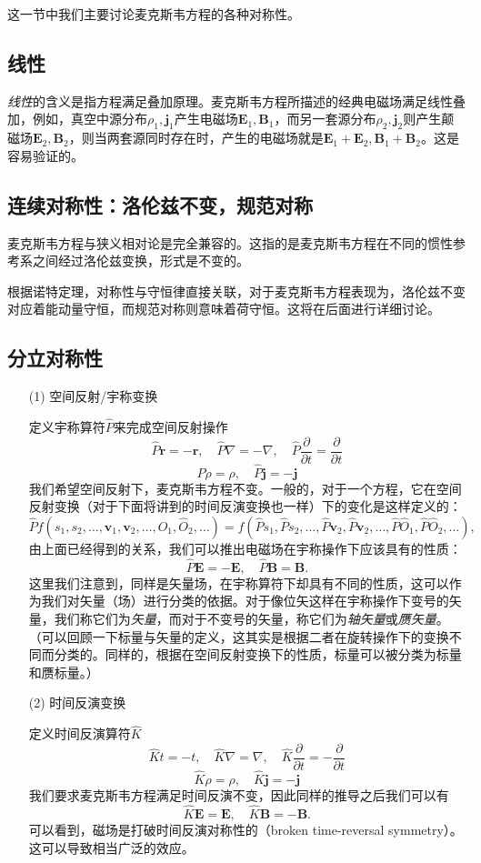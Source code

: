\documentclass[UTF8]{ctexbook}
\renewcommand{\b}{\boldsymbol}
\numberwithin{equation}{chapter}
\begin{document}
	这一节中我们主要讨论麦克斯韦方程的各种对称性。
	\subsection{线性}
	\emph{线性}的含义是指方程满足叠加原理。麦克斯韦方程所描述的经典电磁场满足线性叠加，例如，真空中源分布$\rho_1,\b{j}_1$产生电磁场$\b{E}_1,\b{B}_1$，而另一套源分布$\rho_2,\b{j}_2$则产生颠磁场$\b{E}_2,\b{B}_2$，则当两套源同时存在时，产生的电磁场就是$\b{E}_1+\b{E}_2,\b{B}_1+\b{B}_2$。这是容易验证的。
	
	\subsection{连续对称性：洛伦兹不变，规范对称}
	麦克斯韦方程与狭义相对论是完全兼容的。这指的是麦克斯韦方程在不同的惯性参考系之间经过洛伦兹变换，形式是不变的。
	
	根据诺特定理，对称性与守恒律直接关联，对于麦克斯韦方程表现为，洛伦兹不变对应着能动量守恒，而规范对称则意味着荷守恒。这将在后面进行详细讨论。
	
	\subsection{分立对称性}
	\begin{itemize}
		\item[(1)]空间反射/宇称变换
		
		定义宇称算符$\hat{P}$来完成空间反射操作
		\[\hat{P}\b{r}=-\b{r},\quad\hat{P}\nabla=-\nabla,\quad \hat{P}\frac{\partial}{\partial t}=\frac{\partial }{\partial t}\]
		\[\hat{P}\rho=\rho,\quad \hat{P}\b{j}=-\b{j}\]
		 我们希望空间反射下，麦克斯韦方程不变。一般的，对于一个方程，它在空间反射变换（对于下面将讲到的时间反演变换也一样）下的变化是这样定义的：
		 \[\hat{P}f(s_1,s_2,\dots,\b{v}_1,\b{v}_2,\dots,\hat{O}_1,\hat{O}_2,\dots)=f(\hat{P}s_1,\hat{P}s_2,\dots,\hat{P}\b{v}_2,\hat{P}\b{v}_2,\dots,\hat{P}\hat{O}_1,\hat{P}\hat{O}_2,\dots),\]
		 由上面已经得到的关系，我们可以推出电磁场在宇称操作下应该具有的性质：
		 \[\hat{P}\b{E}=-\b{E},\quad \hat{P}\b{B}=\b{B}.\]
		 这里我们注意到，同样是矢量场，在宇称算符下却具有不同的性质，这可以作为我们对矢量（场）进行分类的依据。对于像位矢这样在宇称操作下变号的矢量，我们称它们为\emph{矢量}，而对于不变号的矢量，称它们为\emph{轴矢量}或\emph{赝矢量}。（可以回顾一下标量与矢量的定义，这其实是根据二者在旋转操作下的变换不同而分类的。同样的，根据在空间反射变换下的性质，标量可以被分类为标量和赝标量。）
		 
		 \item[(2)]时间反演变换
		 
		 定义时间反演算符$\hat{K}$
		 \[\hat{K}t=-t,\quad \hat{K}\nabla=\nabla,\quad \hat{K}\frac{\partial }{\partial t}=-\frac{\partial }{\partial t}\]
		 \[\hat{K}\rho=\rho,\quad \hat{K}\b{j}=-\b{j}\]
		 我们要求麦克斯韦方程满足时间反演不变，因此同样的推导之后我们可以有
		 \[\hat{K}\b{E}=\b{E},\quad \hat{K}\b{B}=-\b{B}.\]
		 可以看到，磁场是打破时间反演对称性的（broken time-reversal symmetry）。这可以导致相当广泛的效应。
		 
	\end{itemize}
\end{document}
